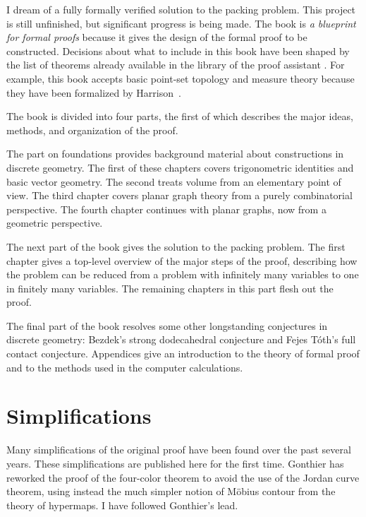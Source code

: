 I dream of a fully formally verified solution to the
packing problem.  This project is still unfinished, but significant
progress is being made.   The book is {\it a blueprint for formal
  proofs} because it gives the design of the formal proof to be
constructed.  Decisions about what to include in this book have been
shaped by the list of theorems already available in the library of the
proof assistant .  For example, this book accepts basic
point-set topology and measure theory because they have been formalized by
Harrison~\cite{HOLL}.


The book is divided into four parts, the first of which
 describes the major ideas, methods, and
organization of the proof.  


The part on foundations provides background material about
constructions in discrete geometry.  The first of these chapters
covers trigonometric identities and basic vector geometry.  The second
treats volume from an elementary point of view.  The third chapter
covers planar graph theory from a purely combinatorial perspective.
The fourth chapter continues with planar graphs, now from a geometric
perspective.

The next part of the book gives the solution to the packing problem.
The first chapter  gives a top-level overview of the major
steps of the proof,   describing how the problem can be reduced from
a problem with infinitely many variables to one in finitely many
variables.  The remaining chapters in this part flesh out the proof.

The final part of the book resolves some other longstanding conjectures in
discrete geometry: Bezdek's strong dodecahedral conjecture and Fejes
T\'oth's full contact conjecture.  Appendices give an introduction to
the theory of formal proof and to the methods used in the computer calculations.

\section*{Simplifications}

Many simplifications of the original proof have been found over the
past several years.  These simplifications are published here for the
first time.  Gonthier has reworked the proof of the four-color
theorem to avoid the use of the Jordan curve theorem, using instead
the much simpler notion of M\"obius contour from the theory of
hypermaps.  I have followed Gonthier's lead.

